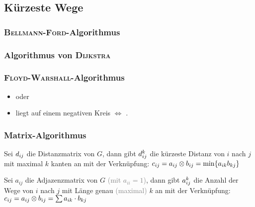 \subsection{Kürzeste Wege}

\subsubsection{\textsc{Bellmann-Ford}-Algorithmus}

\subsubsection{Algorithmus von \textsc{Dijkstra}}

\subsubsection{\textsc{Floyd-Warshall}-Algorithmus}
\begin{itemize}
	\item {} oder 
	\item {} liegt auf einem negativen Kreis $\Leftrightarrow$ .
\end{itemize}

\subsubsection{Matrix-Algorithmus}
Sei $d_{i\smash{j}}$ die Distanzmatrix von $G$, dann gibt $d_{i\smash{j}}^k$ die kürzeste Distanz von $i$ nach $j$ mit maximal $k$ kanten an mit der Verknüpfung: $c_{i\smash{j}} = a_{i\smash{j}} \otimes b_{i\smash{j}} = \min\{a_{ik} b_{k\smash{j}}\}$


Sei $a_{ij}$ die Adjazenzmatrix von $G$ \textcolor{gray}{(mit $a_{ii} = 1$)}, dann gibt $a_{i\smash{j}}^k$ die Anzahl der Wege von $i$ nach $j$ mit Länge genau \textcolor{gray}{(maximal)} $k$ an mit der Verknüpfung: $c_{i\smash{j}} = a_{i\smash{j}} \otimes b_{i\smash{j}} = \sum a_{ik} \cdot b_{k\smash{j}}$



